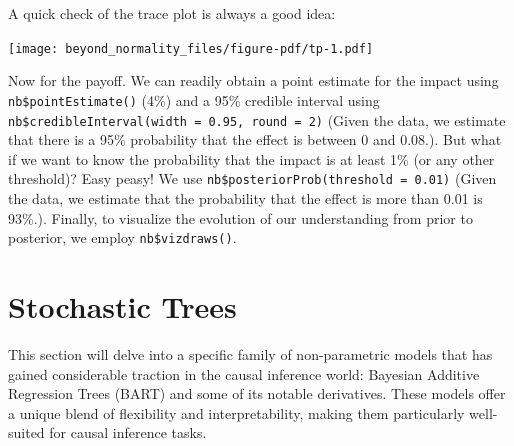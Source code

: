 \documentclass[
  letterpaper,
  DIV=11,
  numbers=noendperiod]{scrreprt}
\newenvironment{Shaded}{\begin{snugshade}}{\end{snugshade}}
\newcommand{\AttributeTok}[1]{\textcolor[rgb]{0.40,0.45,0.13}{#1}}
\newcommand{\FloatTok}[1]{\textcolor[rgb]{0.68,0.00,0.00}{#1}}
\newcommand{\FunctionTok}[1]{\textcolor[rgb]{0.28,0.35,0.67}{#1}}
\newcommand{\NormalTok}[1]{\textcolor[rgb]{0.00,0.23,0.31}{#1}}
\newcommand{\OtherTok}[1]{\textcolor[rgb]{0.00,0.23,0.31}{#1}}
\newcommand{\SpecialCharTok}[1]{\textcolor[rgb]{0.37,0.37,0.37}{#1}}
\newcommand{\StringTok}[1]{\textcolor[rgb]{0.13,0.47,0.30}{#1}}
\begin{document}
\begin{Shaded}
\end{Shaded}

A quick check of the trace plot is always a good idea:

\begin{Shaded}
\end{Shaded}

\texttt{[image: beyond\_normality\_files/figure-pdf/tp-1.pdf]}

Now for the payoff. We can readily obtain a point estimate for the
impact using \texttt{nb\$pointEstimate()} (4\%) and a 95\% credible
interval using
\texttt{nb\$credibleInterval(width\ =\ 0.95,\ round\ =\ 2)} (Given the
data, we estimate that there is a 95\% probability that the effect is
between 0 and 0.08.). But what if we want to know the probability that
the impact is at least 1\% (or any other threshold)? Easy peasy! We use
\texttt{nb\$posteriorProb(threshold\ =\ 0.01)} (Given the data, we
estimate that the probability that the effect is more than 0.01 is
93\%.). Finally, to visualize the evolution of our understanding from
prior to posterior, we employ \texttt{nb\$vizdraws()}.

\part{Stochastic Trees}

This section will delve into a specific family of non-parametric models
that has gained considerable traction in the causal inference world:
Bayesian Additive Regression Trees (BART) and some of its notable
derivatives. These models offer a unique blend of flexibility and
interpretability, making them particularly well-suited for causal
inference tasks.
\end{document}

